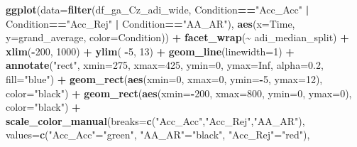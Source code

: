 \documentclass[
]{article}
\newenvironment{Shaded}{\begin{snugshade}}{\end{snugshade}}
\newcommand{\AttributeTok}[1]{\textcolor[rgb]{0.13,0.29,0.53}{#1}}
\newcommand{\ConstantTok}[1]{\textcolor[rgb]{0.56,0.35,0.01}{#1}}
\newcommand{\DecValTok}[1]{\textcolor[rgb]{0.00,0.00,0.81}{#1}}
\newcommand{\FloatTok}[1]{\textcolor[rgb]{0.00,0.00,0.81}{#1}}
\newcommand{\FunctionTok}[1]{\textcolor[rgb]{0.13,0.29,0.53}{\textbf{#1}}}
\newcommand{\NormalTok}[1]{#1}
\newcommand{\OtherTok}[1]{\textcolor[rgb]{0.56,0.35,0.01}{#1}}
\newcommand{\SpecialCharTok}[1]{\textcolor[rgb]{0.81,0.36,0.00}{\textbf{#1}}}
\newcommand{\StringTok}[1]{\textcolor[rgb]{0.31,0.60,0.02}{#1}}
\begin{document}
\begin{Shaded}
\begin{Highlighting}[]
\FunctionTok{ggplot}\NormalTok{(}\AttributeTok{data=}\FunctionTok{filter}\NormalTok{(df\_ga\_Cz\_adi\_wide, Condition}\SpecialCharTok{==}\StringTok{"Acc\_Acc"} \SpecialCharTok{|}\NormalTok{ Condition}\SpecialCharTok{==}\StringTok{"Acc\_Rej"} \SpecialCharTok{|}\NormalTok{ Condition}\SpecialCharTok{==}\StringTok{"AA\_AR"}\NormalTok{), }\FunctionTok{aes}\NormalTok{(}\AttributeTok{x=}\NormalTok{Time, }\AttributeTok{y=}\NormalTok{grand\_average, }\AttributeTok{color=}\NormalTok{Condition)) }\SpecialCharTok{+}
  \FunctionTok{facet\_wrap}\NormalTok{(}\SpecialCharTok{\textasciitilde{}}\NormalTok{ adi\_median\_split) }\SpecialCharTok{+}
  \FunctionTok{xlim}\NormalTok{(}\SpecialCharTok{{-}}\DecValTok{200}\NormalTok{, }\DecValTok{1000}\NormalTok{) }\SpecialCharTok{+}
  \FunctionTok{ylim}\NormalTok{( }\SpecialCharTok{{-}}\DecValTok{5}\NormalTok{, }\DecValTok{13}\NormalTok{) }\SpecialCharTok{+}
  \FunctionTok{geom\_line}\NormalTok{(}\AttributeTok{linewidth=}\DecValTok{1}\NormalTok{) }\SpecialCharTok{+}
  \FunctionTok{annotate}\NormalTok{(}\StringTok{"rect"}\NormalTok{, }\AttributeTok{xmin=}\DecValTok{275}\NormalTok{, }\AttributeTok{xmax=}\DecValTok{425}\NormalTok{, }\AttributeTok{ymin=}\DecValTok{0}\NormalTok{, }\AttributeTok{ymax=}\ConstantTok{Inf}\NormalTok{, }\AttributeTok{alpha=}\FloatTok{0.2}\NormalTok{, }\AttributeTok{fill=}\StringTok{"blue"}\NormalTok{) }\SpecialCharTok{+}
  \FunctionTok{geom\_rect}\NormalTok{(}\FunctionTok{aes}\NormalTok{(}\AttributeTok{xmin=}\DecValTok{0}\NormalTok{, }\AttributeTok{xmax=}\DecValTok{0}\NormalTok{, }\AttributeTok{ymin=}\SpecialCharTok{{-}}\DecValTok{5}\NormalTok{, }\AttributeTok{ymax=}\DecValTok{12}\NormalTok{), }\AttributeTok{color=}\StringTok{"black"}\NormalTok{) }\SpecialCharTok{+}
  \FunctionTok{geom\_rect}\NormalTok{(}\FunctionTok{aes}\NormalTok{(}\AttributeTok{xmin=}\SpecialCharTok{{-}}\DecValTok{200}\NormalTok{, }\AttributeTok{xmax=}\DecValTok{800}\NormalTok{, }\AttributeTok{ymin=}\DecValTok{0}\NormalTok{, }\AttributeTok{ymax=}\DecValTok{0}\NormalTok{), }\AttributeTok{color=}\StringTok{"black"}\NormalTok{) }\SpecialCharTok{+}
  \FunctionTok{scale\_color\_manual}\NormalTok{(}\AttributeTok{breaks=}\FunctionTok{c}\NormalTok{(}\StringTok{"Acc\_Acc"}\NormalTok{,}\StringTok{"Acc\_Rej"}\NormalTok{,}\StringTok{"AA\_AR"}\NormalTok{),}
                     \AttributeTok{values=}\FunctionTok{c}\NormalTok{(}\StringTok{"Acc\_Acc"}\OtherTok{=}\StringTok{"green"}\NormalTok{, }\StringTok{"AA\_AR"}\OtherTok{=}\StringTok{"black"}\NormalTok{, }\StringTok{"Acc\_Rej"}\OtherTok{=}\StringTok{"red"}\NormalTok{), }

\end{Highlighting}
\end{Shaded}
\end{document}

